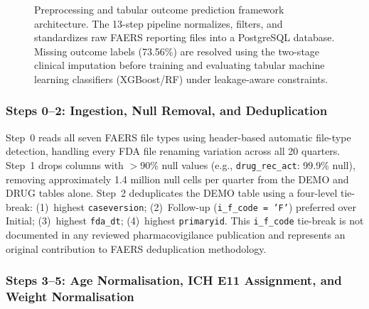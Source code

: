 \documentclass[10pt,twocolumn]{article}
\newcommand{\FAERS}{\textsf{FAERS}\xspace}
\begin{document}
\begin{figure}[htbp]
{
}%
\caption{Preprocessing and tabular outcome prediction framework architecture. The 13-step pipeline normalizes, filters, and standardizes raw FAERS reporting files into a PostgreSQL database. Missing outcome labels (73.56\%) are resolved using the two-stage clinical imputation before training and evaluating tabular machine learning classifiers (XGBoost/RF) under leakage-aware constraints.}
\label{fig:framework_overview}
\end{figure}
 

\subsubsection{Steps 0--2: Ingestion, Null Removal, and Deduplication}
 
Step~0 reads all seven \FAERS file types using header-based automatic file-type detection, handling every FDA file renaming variation across all 20 quarters. Step~1 drops columns with $>$90\% null values (e.g., \texttt{drug\_rec\_act}: 99.9\% null), removing approximately 1.4 million null cells per quarter from the DEMO and DRUG tables alone. Step~2 deduplicates the DEMO table using a four-level tie-break: (1)~highest \texttt{caseversion}; (2)~Follow-up (\texttt{i\_f\_code\,=\,'F'}) preferred over Initial; (3)~highest \texttt{fda\_dt}; (4)~highest \texttt{primaryid}. This \texttt{i\_f\_code} tie-break is not documented in any reviewed pharmacovigilance publication and represents an original contribution to FAERS deduplication methodology.
 
\subsubsection{Steps 3--5: Age Normalisation, ICH E11 Assignment, and Weight Normalisation}
 
\end{document}
